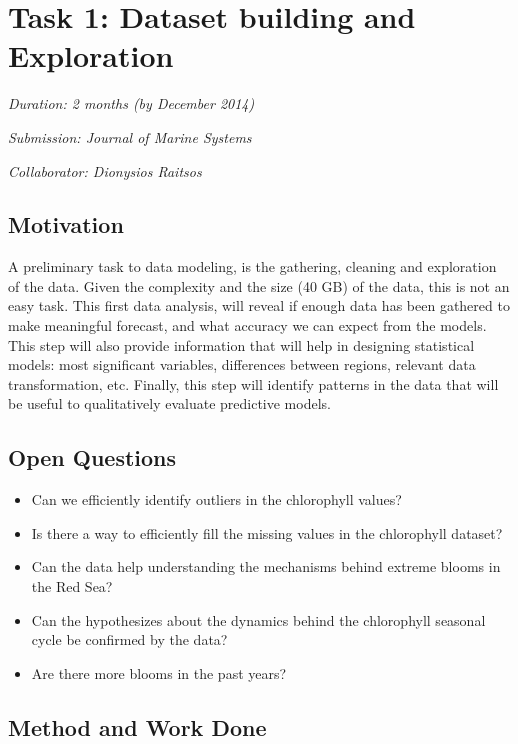 \section{Task 1: Dataset building and Exploration}

\noindent
\emph{Duration: 2 months (by December 2014)}

\noindent
\emph{Submission: Journal of Marine Systems}

\noindent
\emph{Collaborator: Dionysios Raitsos}

\subsection{Motivation}

A preliminary task to data modeling, is the gathering, cleaning and exploration of the data. Given the complexity and the size (40 GB) of the data, this is not an easy task. This first data analysis, will reveal if enough data has been gathered to make meaningful forecast, and what accuracy we can expect from the models. This step will also provide information that will help in designing statistical models: most significant variables, differences between regions, relevant data transformation, etc. Finally, this step will identify patterns in the data that will be useful to qualitatively evaluate predictive models.

\subsection{Open Questions}

\begin{itemize}
\item Can we efficiently identify outliers in the chlorophyll values?
\item Is there a way to efficiently fill the missing values in the chlorophyll dataset?
\item Can the data help understanding the mechanisms behind extreme blooms in the Red Sea?
\item Can the hypothesizes about the dynamics behind the chlorophyll seasonal cycle be confirmed by the data?
\item Are there more blooms in the past years?
\end{itemize}

\subsection{Method and Work Done}

